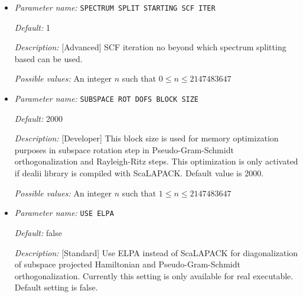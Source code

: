 \begin{itemize}
{\it Possible values:} An integer $n$ such that $0\leq n \leq 2147483647$
\item {\it Parameter name:} {\tt SPECTRUM SPLIT STARTING SCF ITER}
\label{parameters:SCF parameters/Eigen_2dsolver parameters/SPECTRUM SPLIT STARTING SCF ITER}
\label{parameters:SCF_20parameters/Eigen_2dsolver_20parameters/SPECTRUM_20SPLIT_20STARTING_20SCF_20ITER}




{\it Default:} 1


{\it Description:} [Advanced] SCF iteration no beyond which spectrum splitting based can be used.


{\it Possible values:} An integer $n$ such that $0\leq n \leq 2147483647$
\item {\it Parameter name:} {\tt SUBSPACE ROT DOFS BLOCK SIZE}
\label{parameters:SCF parameters/Eigen_2dsolver parameters/SUBSPACE ROT DOFS BLOCK SIZE}
\label{parameters:SCF_20parameters/Eigen_2dsolver_20parameters/SUBSPACE_20ROT_20DOFS_20BLOCK_20SIZE}




{\it Default:} 2000


{\it Description:} [Developer] This block size is used for memory optimization purposes in subspace rotation step in Pseudo-Gram-Schmidt orthogonalization and Rayleigh-Ritz steps. This optimization is only activated if dealii library is compiled with ScaLAPACK. Default value is 2000.


{\it Possible values:} An integer $n$ such that $1\leq n \leq 2147483647$
\item {\it Parameter name:} {\tt USE ELPA}
\label{parameters:SCF parameters/Eigen_2dsolver parameters/USE ELPA}
\label{parameters:SCF_20parameters/Eigen_2dsolver_20parameters/USE_20ELPA}




{\it Default:} false


{\it Description:} [Standard] Use ELPA instead of ScaLAPACK for diagonalization of subspace projected Hamiltonian and Pseudo-Gram-Schmidt orthogonalization. Currently this setting is only available for real executable. Default setting is false.



\end{itemize}
